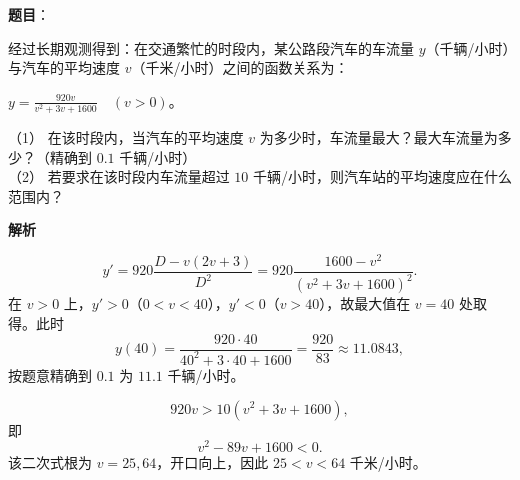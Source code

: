 \begin{answer}

\textbf{题目}：

经过长期观测得到：在交通繁忙的时段内，某公路段汽车的车流量 $y$（千辆/小时）与汽车的平均速度 $v$（千米/小时）之间的函数关系为：

$\displaystyle y=\frac{920v}{v^2+3v+1600}\quad(v>0)$。

（1） 在该时段内，当汽车的平均速度 $v$ 为多少时，车流量最大？最大车流量为多少？（精确到 $0.1$ 千辆/小时）\\
（2） 若要求在该时段内车流量超过 $10$ 千辆/小时，则汽车站的平均速度应在什么范围内？

\textbf{解析}

\nopagebreak[4]
\[y'=920\frac{D-v(2v+3)}{D^2}
=920\frac{1600-v^2}{(v^2+3v+1600)^2}.\]
在 $v>0$ 上，$y'>0$（$0<v<40$），$y'<0$（$v>40$），故最大值在 $v=40$ 处取得。此时
\nopagebreak[4]
\[y(40)=\frac{920\cdot40}{40^2+3\cdot40+1600}
=\frac{920}{83}\approx11.0843,\]
按题意精确到 $0.1$ 为 $11.1$ 千辆/小时。

\nopagebreak[4]
\[920v>10(v^2+3v+1600),\]
即
\nopagebreak[4]
\[v^2-89v+1600<0.\]
该二次式根为 $v=25,64$，开口向上，因此 $25<v<64$ 千米/小时。



\end{answer}
